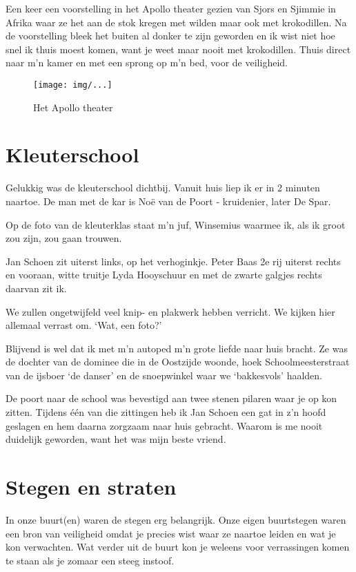 \documentclass[10pt,twoside,openright]{memoir}
\begin{document}
Een keer een voorstelling in het Apollo theater gezien van Sjors en Sjimmie in Afrika waar ze het aan de stok kregen met wilden maar ook met krokodillen. Na de voorstelling bleek het buiten al donker te zijn geworden en ik wist niet hoe snel ik thuis moest komen, want je weet maar nooit met krokodillen. Thuis direct naar m’n kamer en met een sprong op m’n bed, voor de veiligheid. 

\begin{figure}[t]
\texttt{[image: img/...]}
\caption{Het Apollo theater}
\end{figure}

\chapter{Kleuterschool} %
\label{cha:kleuterschool}

Gelukkig was de kleuterschool dichtbij. Vanuit huis liep ik er in 2 minuten naartoe. De man met de kar is Noë van de Poort - kruidenier, later De Spar.

Op de foto van de kleuterklas staat m’n juf, Winsemius waarmee ik, als ik groot zou zijn, zou gaan trouwen. 

Jan Schoen zit uiterst links, op het verhoginkje. Peter Baas 2e rij uiterst rechts en vooraan, witte truitje Lyda Hooyschuur en met de zwarte galgjes rechts daarvan zit ik. 

We zullen ongetwijfeld veel knip- en plakwerk hebben verricht. We kijken hier allemaal verrast om. ‘Wat, een foto?’

Blijvend is wel dat ik met m’n autoped m’n grote liefde naar huis bracht. Ze was de dochter van de dominee die in de Oostzijde woonde, hoek Schoolmeesterstraat van de ijsboer ‘de danser’ en de snoepwinkel waar we ‘bakkesvols’ haalden. 

De poort naar de school was bevestigd aan twee stenen pilaren waar je op kon zitten. Tijdens één van die zittingen heb ik Jan Schoen een gat in z’n hoofd geslagen en hem daarna zorgzaam naar huis gebracht. Waarom is me nooit duidelijk geworden, want het was mijn beste vriend. 

\chapter{Stegen en straten} %
\label{cha:stegen_straten}

In onze buurt(en) waren de stegen erg belangrijk. Onze eigen buurtstegen waren een bron van veiligheid omdat je precies wist waar ze naartoe leiden en wat je kon verwachten. Wat verder uit de buurt kon je weleens voor verrassingen komen te staan als je zomaar een steeg instoof. 
\end{document}
